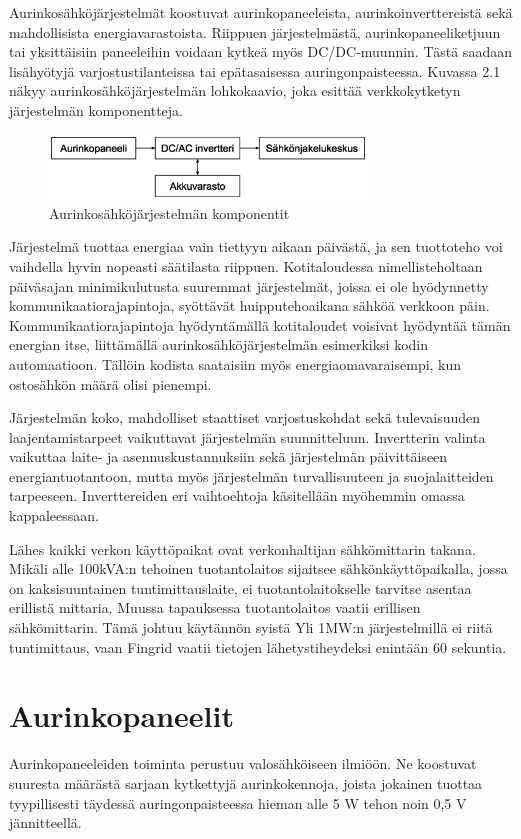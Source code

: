 Aurinkosähköjärjestelmät koostuvat aurinkopaneeleista, aurinkoinverttereistä sekä mahdollisista energiavarastoista. Riippuen järjestelmästä, aurinkopaneeliketjuun tai yksittäisiin paneeleihin voidaan kytkeä myös DC/DC-muunnin. Tästä saadaan lisähyötyjä varjostustilanteissa tai epätasaisessa auringonpaisteessa.  Kuvassa 2.1 näkyy aurinkosähköjärjestelmän lohkokaavio, joka esittää verkkokytketyn järjestelmän komponentteja.
\begin{figure}
  \centering
  \includegraphics[width=0.75\textwidth]{figures/PV_system_components_1}
  \caption{Aurinkosähköjärjestelmän komponentit}
\end{figure}

Järjestelmä tuottaa energiaa vain tiettyyn aikaan päivästä, ja sen tuottoteho voi vaihdella hyvin nopeasti säätilasta riippuen. Kotitaloudessa nimellisteholtaan päiväsajan minimikulutusta suuremmat järjestelmät, joissa ei ole hyödynnetty kommunikaatiorajapintoja, syöttävät huipputehoaikana sähköä verkkoon päin. Kommunikaatiorajapintoja hyödyntämällä kotitaloudet voisivat hyödyntää tämän energian itse, liittämällä aurinkosähköjärjestelmän esimerkiksi kodin automaatioon. Tällöin kodista saataisiin myös energiaomavaraisempi, kun ostosähkön määrä olisi pienempi.

Järjestelmän koko, mahdolliset staattiset varjostuskohdat sekä tulevaisuuden laajentamistarpeet vaikuttavat järjestelmän suunnitteluun. Invertterin valinta vaikuttaa laite- ja asennuskustannuksiin sekä järjestelmän päivittäiseen energiantuotantoon, mutta myös järjestelmän turvallisuuteen ja suojalaitteiden tarpeeseen. Inverttereiden eri vaihtoehtoja käsitellään myöhemmin omassa kappaleessaan.

Lähes kaikki verkon käyttöpaikat ovat verkonhaltijan sähkömittarin takana. Mikäli alle 100kVA:n tehoinen tuotantolaitos sijaitsee sähkönkäyttöpaikalla, jossa on kaksisuuntainen tuntimittauslaite, ei tuotantolaitokselle tarvitse asentaa erillistä mittaria. Muussa tapauksessa tuotantolaitos vaatii erillisen sähkömittarin. Tämä johtuu käytännön syistä Yli 1MW:n järjestelmillä ei riitä tuntimittaus, vaan Fingrid vaatii tietojen lähetystiheydeksi enintään 60 sekuntia. \parencite{VJV2018}

\section{Aurinkopaneelit}
  Aurinkopaneeleiden toiminta perustuu valosähköiseen ilmiöön. Ne koostuvat suuresta määrästä sarjaan kytkettyjä aurinkokennoja, joista jokainen tuottaa tyypillisesti täydessä auringonpaisteessa hieman alle 5 W tehon noin 0,5 V jännitteellä. \parencite{Messenger}


